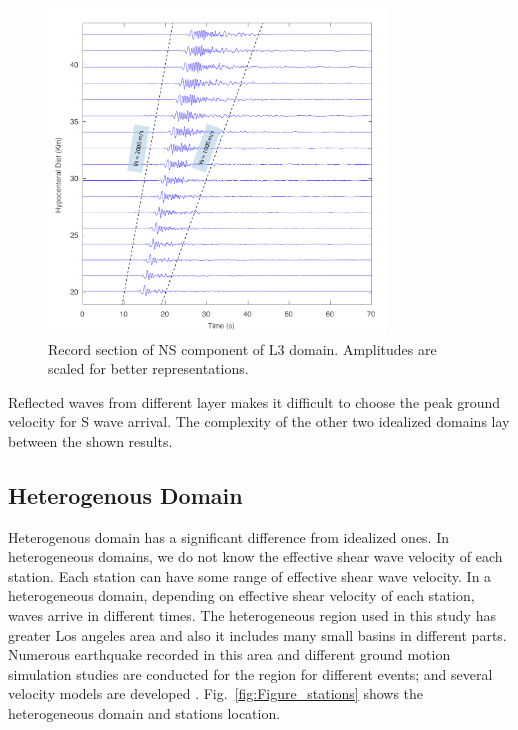   \begin{figure}[ht]
    \centering
    \includegraphics[width=0.8\textwidth]{figures/pdf/Figure_07.pdf}
    \caption{Record section of NS component of L3 domain. Amplitudes are scaled for better representations.}
    \label{fig:record_section_2000_1000_500}
\end{figure}

Reflected waves from different layer makes it difficult to choose the peak ground velocity for S wave arrival. The complexity of the other two idealized domains lay between the shown results. 

\subsection{Heterogenous Domain}

Heterogenous domain has a significant difference from idealized ones. In heterogeneous domains, we do not know the effective shear wave velocity of each station. Each station can have some range of effective shear wave velocity. In a heterogeneous domain, depending on effective shear velocity of each station, waves arrive in different times. The heterogeneous region used in this study has greater Los angeles area and also it includes many small basins in different parts. Numerous earthquake recorded in this area and different ground motion simulation studies are conducted for the region for different events; and several velocity models are developed \citep[e.g., see][]{Taborda_2013_BSSA,Taborda_2014_BSSA,Small_2017_SRL}. Fig.~\ref{fig:Figure_stations} shows the  heterogeneous domain and stations location. 

